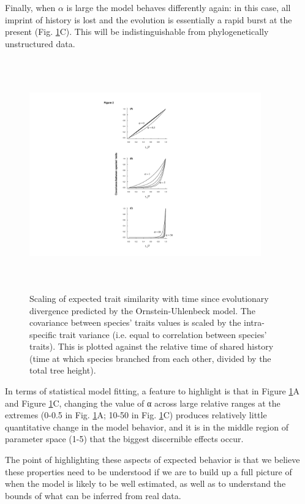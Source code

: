 \documentclass[a4paper,12pt]{article}
\begin{document}
Finally, when $\alpha$ is large the model behaves differently again: in this case, all imprint of history is lost and the evolution is essentially a rapid burst at the present (Fig. \ref{figure.traitsim}C). This will be indistinguishable from phylogenetically unstructured data.  

\begin{figure}
\centering
    \includegraphics[width=10cm, height=10cm, keepaspectratio=true]{Figures/OU_figure2.pdf}
\caption{Scaling of expected trait similarity with time since evolutionary divergence predicted by the Ornstein-Uhlenbeck model. The covariance between species’ traits values is scaled by the intra-specific trait variance (i.e. equal to correlation between species’ traits). This is plotted against the relative time of shared history (time at which species branched from each other, divided by the total tree height). }
\label{figure.traitsim}
\end{figure}

In terms of statistical model fitting, a feature to highlight is that in Figure \ref{figure.traitsim}A and Figure \ref{figure.traitsim}C, changing the value of α across large relative ranges at the extremes (0-0.5 in Fig. \ref{figure.traitsim}A; 10-50 in Fig. \ref{figure.traitsim}C) produces relatively little quantitative change in the model behavior, and it is in the middle region of parameter space (1-5) that the biggest discernible effects occur.

The point of highlighting these aspects of expected behavior is that we believe these properties need to be understood if we are to build up a full picture of when the model is likely to be well estimated, as well as to understand the bounds of what can be inferred from real data. 
\end{document}
